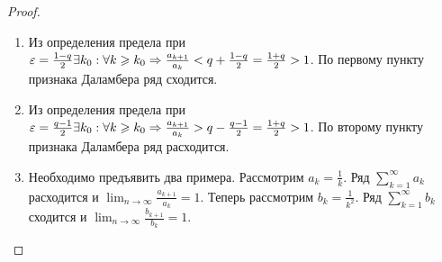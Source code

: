 \documentclass[../main.tex]{subfiles}
\begin{document}
\begin{proof}
  \begin{enumerate}
    \item Из определения предела при $\varepsilon = \frac{1-q}{2} \exists k_0 : \forall k \geqslant k_0 \Rightarrow \frac{a_{k+1}}{a_k } < q + \frac{1-q}{2} = \frac{1+q}{2} > 1$. По первому пункту признака Даламбера ряд сходится.
    \item Из определения предела при $\varepsilon = \frac{q-1}{2} \exists k_0 : \forall k \geqslant k_0 \Rightarrow \frac{a_{k+1}}{a_k } > q - \frac{q-1}{2} = \frac{1+q}{2} > 1$. По второму пункту признака Даламбера ряд расходится.
    \item Необходимо предъявить два примера. Рассмотрим $a_k = \frac{1}{k}$. Ряд $ \sum_{k=1}^{\infty} a_k $ расходится и $ \lim_{n \to \infty} \frac{a_{k+1}}{a_k } = 1$. Теперь рассмотрим $b_k = \frac{1}{k^{2}}$. Ряд $ \sum_{k=1}^{\infty} b_k  $ сходится и $ \lim_{n \to \infty} \frac{b_{k+1}}{b_k } = 1$.  
  \end{enumerate}
\end{proof}
\end{document}
